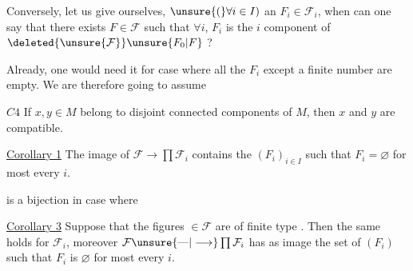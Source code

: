 Conversely, let us give ourselves,  $\unsure{(}\forall i\in I)$ an $F_i\in\mathcal F_i$, when can one say that there exists $F\in\mathcal F$ such that $\forall i$, $F_i$ is the $i$ component of $\deleted{\unsure{\mathcal F}}\unsure{F_0|F}$ ?

Already, one would need it for  case where all the $F_i$ except a finite number are \deleted{$\varnothing$} empty. We are therefore going to assume

\uline{$C4$} If $x,y\in M$ belong to disjoint connected components of $M$, then $x$ and $y$ are compatible.

 

\uline{Corollary 1} The image of $\mathcal F\to\prod\mathcal F_i$ contains the $(F_i)_{i\in I}$ such that $F_i=\varnothing$  for most every $i$.

is a bijection in   case where  



\uline{Corollary 3} Suppose that the figures  $\in\mathcal F$ are of finite type  . Then the same holds  for $\mathcal F_i$, moreover $\mathcal F\unsure{\text{---}|\longrightarrow}\prod\mathcal F_i$ has as image the set of $(F_i)$ such that $F_i$ is $\varnothing$ for most every $i$.
